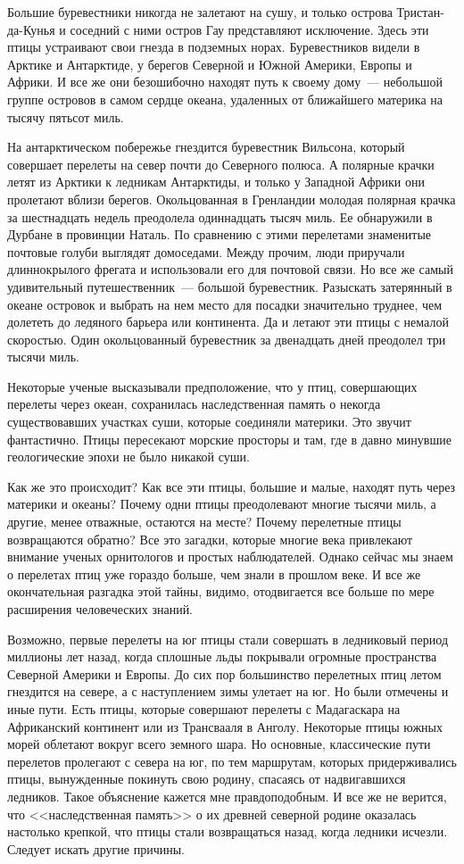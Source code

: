 \documentclass[12pt,a4paper,twoside,openany,svgnames]{memoir}
\begin{document}
Большие буревестники никогда не залетают на сушу, и только острова Тристан-да-Кунья и соседний с ними остров Гау представляют исключение. Здесь эти птицы устраивают свои гнезда в подземных норах. Буревестников видели в Арктике и Антарктиде, у берегов Северной и Южной Америки, Европы и Африки. И все же они безошибочно находят путь к своему дому~--- небольшой группе островов в самом сердце океана, удаленных от ближайшего материка на тысячу пятьсот миль.

На антарктическом побережье гнездится буревестник Вильсона, который совершает перелеты на север почти до Северного полюса. А полярные крачки летят из Арктики к ледникам Антарктиды, и только у Западной Африки они пролетают вблизи берегов. Окольцованная в Гренландии молодая полярная крачка за шестнадцать недель преодолела одиннадцать тысяч миль. Ее обнаружили в Дурбане в провинции Наталь. По сравнению с этими перелетами знаменитые почтовые голуби выглядят домоседами. Между прочим, люди приручали длиннокрылого фрегата и использовали его для почтовой связи. Но все же самый удивительный путешественник~--- большой буревестник. Разыскать затерянный в океане островок и выбрать на нем место для посадки значительно труднее, чем долететь до ледяного барьера или континента. Да и летают эти птицы с немалой скоростью. Один окольцованный буревестник за двенадцать дней преодолел три тысячи миль.

Некоторые ученые высказывали предположение, что у птиц, совершающих перелеты через океан, сохранилась наследственная память о некогда существовавших участках суши, которые соединяли материки. Это звучит фантастично. Птицы пересекают морские просторы и там, где в давно минувшие геологические эпохи не было никакой суши.

Как же это происходит? Как все эти птицы, большие и малые, находят путь через материки и океаны? Почему одни птицы преодолевают многие тысячи миль, а другие, менее отважные, остаются на месте? Почему перелетные птицы возвращаются обратно? Все это загадки, которые многие века привлекают внимание ученых орнитологов и простых наблюдателей. Однако сейчас мы знаем о перелетах птиц уже гораздо больше, чем знали в прошлом веке. И все же окончательная разгадка этой тайны, видимо, отодвигается все больше по мере расширения человеческих знаний.

Возможно, первые перелеты на юг птицы стали совершать в ледниковый период миллионы лет назад, когда сплошные льды покрывали огромные пространства Северной Америки и Европы. До сих пор большинство перелетных птиц летом гнездится на севере, а с наступлением зимы улетает на юг. Но были отмечены и иные пути. Есть птицы, которые совершают перелеты с Мадагаскара на Африканский континент или из Трансвааля в Анголу. Некоторые птицы южных морей облетают вокруг всего земного шара. Но основные, классические пути перелетов пролегают с севера на юг, по тем маршрутам, которых придерживались птицы, вынужденные покинуть свою родину, спасаясь от надвигавшихся ледников. Такое объяснение кажется мне правдоподобным. И все же не верится, что <<наследственная память>> о их древней северной родине оказалась настолько крепкой, что птицы стали возвращаться назад, когда ледники исчезли. Следует искать другие причины.
\end{document}

